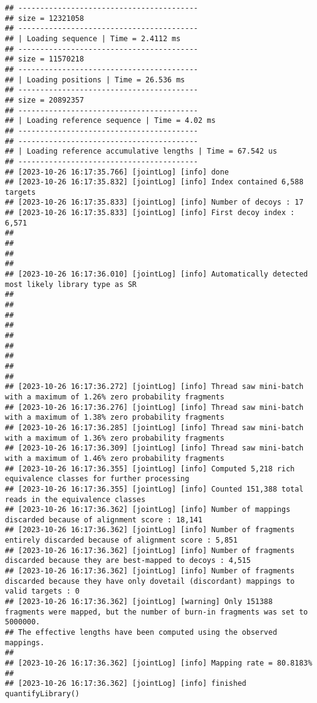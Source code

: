 \documentclass[
]{book}
\begin{document}
\begin{verbatim}
## -----------------------------------------
## size = 12321058
## -----------------------------------------
## | Loading sequence | Time = 2.4112 ms
## -----------------------------------------
## size = 11570218
## -----------------------------------------
## | Loading positions | Time = 26.536 ms
## -----------------------------------------
## size = 20892357
## -----------------------------------------
## | Loading reference sequence | Time = 4.02 ms
## -----------------------------------------
## -----------------------------------------
## | Loading reference accumulative lengths | Time = 67.542 us
## -----------------------------------------
## [2023-10-26 16:17:35.766] [jointLog] [info] done
## [2023-10-26 16:17:35.832] [jointLog] [info] Index contained 6,588 targets
## [2023-10-26 16:17:35.833] [jointLog] [info] Number of decoys : 17
## [2023-10-26 16:17:35.833] [jointLog] [info] First decoy index : 6,571 
## 
## 
## 
## 
## [2023-10-26 16:17:36.010] [jointLog] [info] Automatically detected most likely library type as SR
## 
## 
## 
## 
## 
## 
## 
## 
## 
## [2023-10-26 16:17:36.272] [jointLog] [info] Thread saw mini-batch with a maximum of 1.26% zero probability fragments
## [2023-10-26 16:17:36.276] [jointLog] [info] Thread saw mini-batch with a maximum of 1.38% zero probability fragments
## [2023-10-26 16:17:36.285] [jointLog] [info] Thread saw mini-batch with a maximum of 1.36% zero probability fragments
## [2023-10-26 16:17:36.309] [jointLog] [info] Thread saw mini-batch with a maximum of 1.46% zero probability fragments
## [2023-10-26 16:17:36.355] [jointLog] [info] Computed 5,218 rich equivalence classes for further processing
## [2023-10-26 16:17:36.355] [jointLog] [info] Counted 151,388 total reads in the equivalence classes 
## [2023-10-26 16:17:36.362] [jointLog] [info] Number of mappings discarded because of alignment score : 18,141
## [2023-10-26 16:17:36.362] [jointLog] [info] Number of fragments entirely discarded because of alignment score : 5,851
## [2023-10-26 16:17:36.362] [jointLog] [info] Number of fragments discarded because they are best-mapped to decoys : 4,515
## [2023-10-26 16:17:36.362] [jointLog] [info] Number of fragments discarded because they have only dovetail (discordant) mappings to valid targets : 0
## [2023-10-26 16:17:36.362] [jointLog] [warning] Only 151388 fragments were mapped, but the number of burn-in fragments was set to 5000000.
## The effective lengths have been computed using the observed mappings.
## 
## [2023-10-26 16:17:36.362] [jointLog] [info] Mapping rate = 80.8183%
## 
## [2023-10-26 16:17:36.362] [jointLog] [info] finished quantifyLibrary()

\end{verbatim}
\end{document}
